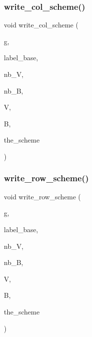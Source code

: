 \mbox{\label{tdo__start_8_c_a76627809e5a8796dd8b8dcf513dc132d}} 
\subsubsection{\texorpdfstring{write\+\_\+col\+\_\+scheme()}{write\_col\_scheme()}}
{\footnotesize\ttfamily void write\+\_\+col\+\_\+scheme (\begin{DoxyParamCaption}\item[{ofstream \&}]{g,  }\item[{\mbox{\hyperlink{galois_8h_ab6cc7b4aeb6ea31aba2b3fbfc83ff5e6}{B\+Y\+TE}} $\ast$}]{label\+\_\+base,  }\item[{\mbox{\hyperlink{galois_8h_a09fddde158a3a20bd2dcadb609de11dc}{I\+NT}}}]{nb\+\_\+V,  }\item[{\mbox{\hyperlink{galois_8h_a09fddde158a3a20bd2dcadb609de11dc}{I\+NT}}}]{nb\+\_\+B,  }\item[{\mbox{\hyperlink{galois_8h_a09fddde158a3a20bd2dcadb609de11dc}{I\+NT}} $\ast$}]{V,  }\item[{\mbox{\hyperlink{galois_8h_a09fddde158a3a20bd2dcadb609de11dc}{I\+NT}} $\ast$}]{B,  }\item[{\mbox{\hyperlink{galois_8h_a09fddde158a3a20bd2dcadb609de11dc}{I\+NT}} $\ast$}]{the\+\_\+scheme }\end{DoxyParamCaption})}

\mbox{\label{tdo__start_8_c_a9c96af0bbb14c77f93ad10189cc53f29}} 
\subsubsection{\texorpdfstring{write\+\_\+row\+\_\+scheme()}{write\_row\_scheme()}}
{\footnotesize\ttfamily void write\+\_\+row\+\_\+scheme (\begin{DoxyParamCaption}\item[{ofstream \&}]{g,  }\item[{\mbox{\hyperlink{galois_8h_ab6cc7b4aeb6ea31aba2b3fbfc83ff5e6}{B\+Y\+TE}} $\ast$}]{label\+\_\+base,  }\item[{\mbox{\hyperlink{galois_8h_a09fddde158a3a20bd2dcadb609de11dc}{I\+NT}}}]{nb\+\_\+V,  }\item[{\mbox{\hyperlink{galois_8h_a09fddde158a3a20bd2dcadb609de11dc}{I\+NT}}}]{nb\+\_\+B,  }\item[{\mbox{\hyperlink{galois_8h_a09fddde158a3a20bd2dcadb609de11dc}{I\+NT}} $\ast$}]{V,  }\item[{\mbox{\hyperlink{galois_8h_a09fddde158a3a20bd2dcadb609de11dc}{I\+NT}} $\ast$}]{B,  }\item[{\mbox{\hyperlink{galois_8h_a09fddde158a3a20bd2dcadb609de11dc}{I\+NT}} $\ast$}]{the\+\_\+scheme }\end{DoxyParamCaption})}

